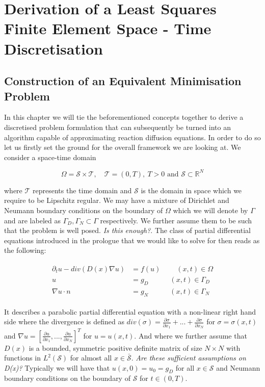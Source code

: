 \documentclass[../draft_1.tex]{subfiles}
\begin{document}
\chapter{Derivation of a Least Squares Finite Element Space - Time Discretisation}
\section{Construction of an Equivalent Minimisation Problem}

In this chapter we will tie the beforementioned concepts together to derive a discretised problem formulation that can subsequently be turned into an algorithm capable of approximating reaction diffusion equations. In order to do so let us firstly set the ground for the overall framework we are looking at. We consider a space-time domain 
\begin{ceqn}
\begin{equation}
\Omega = \mathcal{S} \times \mathcal{T}, \quad \mathcal{T} = (0,T), \ T>0 \text{ and }  \mathcal{S} \subset \mathbb{R}^N
\end{equation} 
\end{ceqn}
where $\mathcal{T} $ represents the time domain and $ \mathcal{S}$ is the domain in space which we require to be Lipschitz regular. We may have a mixture of Dirichlet and Neumann boundary conditions on the boundary of $\Omega$ which we will denote by $\Gamma$ and are labeled as $\Gamma_D, \Gamma_N \subset \Gamma$ respectively. We further assume them to be such that the problem is well posed. \textit{Is this enough?}.  The class of partial differential equations introduced in the prologue that we would like to solve for then reads as the following:
\begin{ceqn}
\begin{align}
\begin{aligned}
\partial_t u - div (D(x) \nabla u) &= f(u) \qquad \  (x,t) \in \Omega \\
u &= g_D \quad \qquad (x,t)  \in \Gamma_D \\
\nabla u \cdot n &= g_N \quad \qquad (x,t) \in \Gamma_N
\end{aligned}
\end{align}
\end{ceqn}
It describes a parabolic partial differential equation with a non-linear right hand side where the divergence is defined as $div(\sigma) = \frac{\partial \sigma}{\partial x_1} + ... + \frac{\partial \sigma}{\partial x_N}$ for $\sigma = \sigma(x,t)$ and $\nabla u = [\frac{\partial u}{\partial x_1}, ..., \frac{\partial u}{\partial x_N} ]^T$ for $u = u(x,t)$. And where we further assume that $D(x)$ is a bounded, symmetric positive definite matrix of size $N \times N$ with functions in $L^2(\mathcal{S})$ for almost all $ x \in \bar{\mathcal{S}}$. \textit{Are these sufficient assumptions on D(x)?} Typically we will have that $u(x,0) = u_0 = g_D$ for all $ x \in \mathcal{S}$ and Neumann boundary conditions on the boundary of $\mathcal{S}$ for $t \in (0,T)$. 
\end{document}
